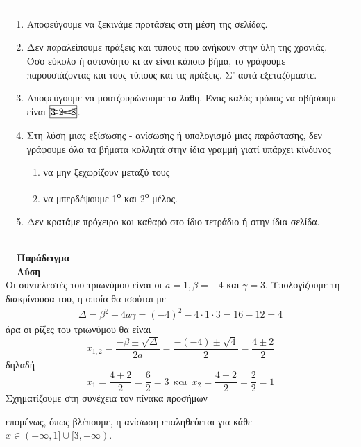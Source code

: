 \documentclass[twoside,nofonts,internet,math,spyros]{frontisthrio}
\newcommand{\tss}[1]{\textsuperscript{#1}}
\begin{document}
\begin{center}
\begin{tabular}{p{8cm}|p{8cm}}
\begin{enumerate}
\item Αποφεύγουμε να ξεκινάμε προτάσεις στη μέση της σελίδας.
\item Δεν παραλείπουμε πράξεις και τύπους που ανήκουν στην ύλη της χρονιάς. Όσο εύκολο ή αυτονόητο κι αν είναι κάποιο βήμα, το γράφουμε παρουσιάζοντας και τους τύπους και τις πράξεις. Σ' αυτά εξεταζόμαστε.
\item Αποφεύγουμε να μουτζουρώνουμε τα λάθη. Ένας καλός τρόπος να σβήσουμε είναι $ \framebox[1cm]{\xcancel{3-2=8}} $.
\item Στη λύση μιας εξίσωσης - ανίσωσης ή υπολογισμό μιας παράστασης, δεν γράφουμε όλα τα βήματα κολλητά στην ίδια γραμμή γιατί υπάρχει κίνδυνος
\begin{enumerate}
\item να μην ξεχωρίζουν μεταξύ τους
\item να μπερδέψουμε 1\tss{ο} και 2\tss{ο} μέλος.
\end{enumerate}
\item Δεν κρατάμε πρόχειρο και καθαρό στο ίδιο τετράδιο ή στην ίδια σελίδα.
\end{enumerate}
\end{tabular} 
\end{center}
\newpage
\noindent
\textbf{\large \textcolor{orange}{}\ \  Παράδειγμα}\\
\textbf{\large \textcolor{cyan}{}\ \  Λύση}\\
Οι συντελεστές του τριωνύμου είναι οι $ a=1,\beta=-4 $ και $ \gamma=3 $. Υπολογίζουμε τη διακρίνουσα του, η οποία θα ισούται με
\begin{gather*}
\varDelta=\beta^2-4a\gamma=(-4)^2-4\cdot 1\cdot 3=16-12=4
\end{gather*}
άρα οι ρίζες του τριωνύμου θα είναι 
\[ x_{1,2}=\frac{-\beta\pm\sqrt{\varDelta}}{2a}=\frac{-(-4)\pm \sqrt{4}}{2}=\frac{4\pm 2}{2} \]
δηλαδή
\[ x_1=\frac{4+2}{2}=\frac{6}{2}=3\ \ \textrm{και}\ \ x_2=\frac{4-2}{2}=\frac{2}{2}=1 \]
Σχηματίζουμε στη συνέχεια τον πίνακα προσήμων
\begin{center}
\end{center}
επομένως, όπως βλέπουμε, η ανίσωση επαληθεύεται για κάθε $ x\in (-\infty,1]\cup[3,+\infty) $.\\\\
\end{document}

